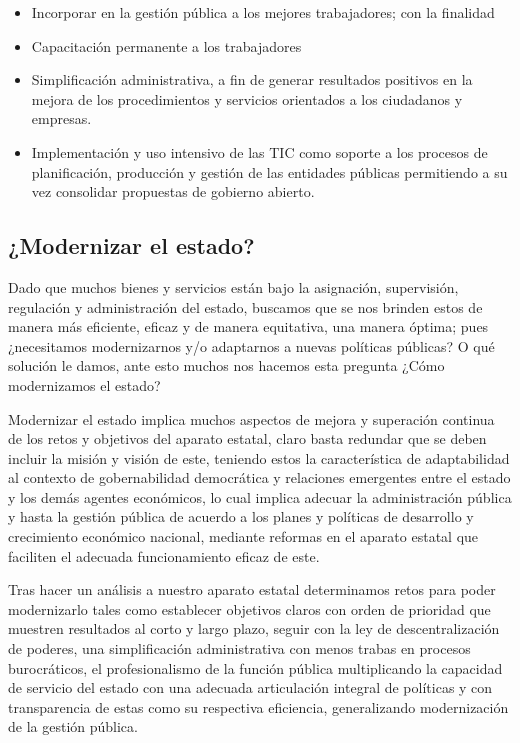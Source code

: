 \documentclass[
  jou,
  floatsintext,
  longtable,
  a4paper,
  nolmodern,
  notxfonts,
  notimes,
  12pt,
  colorlinks=true,linkcolor=blue,citecolor=blue,urlcolor=blue]{apa7}
\providecommand{\tightlist}{%
  \setlength{\itemsep}{0pt}\setlength{\parskip}{0pt}}
\begin{document}
\begin{itemize}
\tightlist
\item
  Incorporar en la gestión pública a los mejores trabajadores; con la
  finalidad
\item
  Capacitación permanente a los trabajadores
\item
  Simplificación administrativa, a fin de generar resultados positivos
  en la mejora de los procedimientos y servicios orientados a los
  ciudadanos y empresas.
\item
  Implementación y uso intensivo de las TIC como soporte a los procesos
  de planificación, producción y gestión de las entidades públicas
  permitiendo a su vez consolidar propuestas de gobierno abierto.
\end{itemize}

\subsection{¿Modernizar el estado?}\label{modernizar-el-estado}

Dado que muchos bienes y servicios están bajo la asignación,
supervisión, regulación y administración del estado, buscamos que se nos
brinden estos de manera más eficiente, eficaz y de manera equitativa,
una manera óptima; pues ¿necesitamos modernizarnos y/o adaptarnos a
nuevas políticas públicas? O qué solución le damos, ante esto muchos nos
hacemos esta pregunta ¿Cómo modernizamos el estado?

Modernizar el estado implica muchos aspectos de mejora y superación
continua de los retos y objetivos del aparato estatal, claro basta
redundar que se deben incluir la misión y visión de este, teniendo estos
la característica de adaptabilidad al contexto de gobernabilidad
democrática y relaciones emergentes entre el estado y los demás agentes
económicos, lo cual implica adecuar la administración pública y hasta la
gestión pública de acuerdo a los planes y políticas de desarrollo y
crecimiento económico nacional, mediante reformas en el aparato estatal
que faciliten el adecuada funcionamiento eficaz de este.

Tras hacer un análisis a nuestro aparato estatal determinamos retos para
poder modernizarlo tales como establecer objetivos claros con orden de
prioridad que muestren resultados al corto y largo plazo, seguir con la
ley de descentralización de poderes, una simplificación administrativa
con menos trabas en procesos burocráticos, el profesionalismo de la
función pública multiplicando la capacidad de servicio del estado con
una adecuada articulación integral de políticas y con transparencia de
estas como su respectiva eficiencia, generalizando modernización de la
gestión pública.
\end{document}
